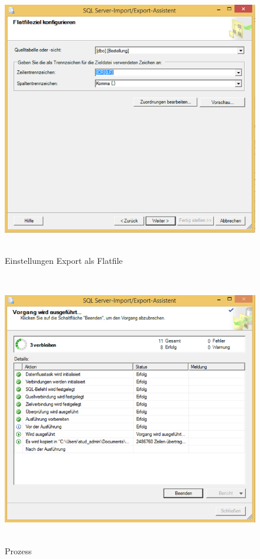 \documentclass[a4paper, 12pt]{scrartcl}
\begin{document}
\begin{figure}[H]
\centering
\includegraphics[height=12cm, width=15cm, keepaspectratio]{FlatExport.png}
\caption{Einstellungen Export als Flatfile}
\end{figure}

\begin{figure}[H]
\centering
\includegraphics[height=12cm, width=15cm, keepaspectratio]{FlatExport2.png}
\caption{Prozess}
\end{figure}
\end{document}
